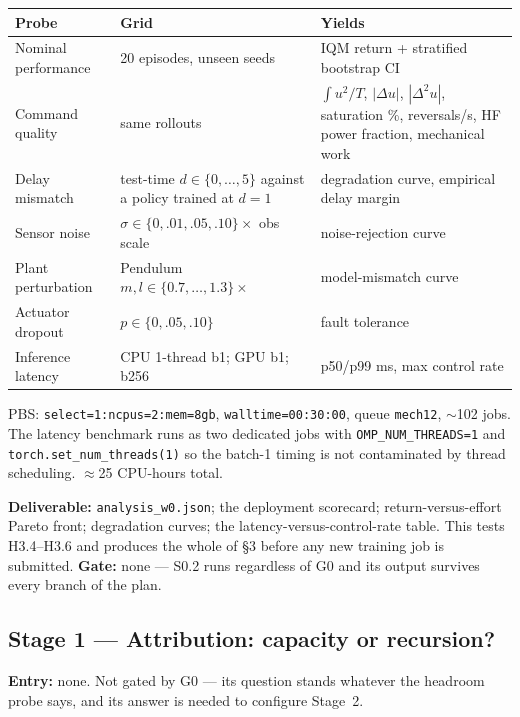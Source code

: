 \documentclass[11pt]{article}
\newcommand{\code}[1]{\texttt{\small #1}}
\begin{document}
\begin{center}\small
\begin{tabular}{@{}lp{}p{}@{}}
\toprule
\textbf{Probe} & \textbf{Grid} & \textbf{Yields} \\
\midrule
Nominal performance & 20 episodes, unseen seeds & IQM return + stratified bootstrap CI \\
Command quality & same rollouts & $\int u^2/T$, $|\Delta u|$, $|\Delta^2 u|$, saturation \%, reversals/s, HF power fraction, mechanical work \\
Delay mismatch & test-time $d \in \{0,\dots,5\}$ against a policy trained at $d{=}1$ & degradation curve, empirical delay margin \\
Sensor noise & $\sigma \in \{0, .01, .05, .10\}\times$ obs scale & noise-rejection curve \\
Plant perturbation & Pendulum $m, l \in \{0.7, \dots, 1.3\}\times$ & model-mismatch curve \\
Actuator dropout & $p \in \{0, .05, .10\}$ & fault tolerance \\
Inference latency & CPU 1-thread b1; GPU b1; b256 & p50/p99 ms, max control rate \\
\bottomrule
\end{tabular}
\end{center}

PBS: \code{select=1:ncpus=2:mem=8gb}, \code{walltime=00:30:00}, queue \code{mech12}, ${\sim}$102 jobs. The latency benchmark runs as two dedicated jobs with \code{OMP\_NUM\_THREADS=1} and \code{torch.set\_num\_threads(1)} so the batch-1 timing is not contaminated by thread scheduling. $\approx$25 CPU-hours total.

\textbf{Deliverable:} \code{analysis\_w0.json}; the deployment scorecard; return-versus-effort Pareto front; degradation curves; the latency-versus-control-rate table. This tests H3.4--H3.6 and produces the whole of \S3 before any new training job is submitted. \textbf{Gate:} none --- S0.2 runs regardless of G0 and its output survives every branch of the plan.

\subsection{Stage 1 --- Attribution: capacity or recursion?}

\textbf{Entry:} none. Not gated by G0 --- its question stands whatever the headroom probe says, and its answer is needed to configure Stage~2.
\end{document}
